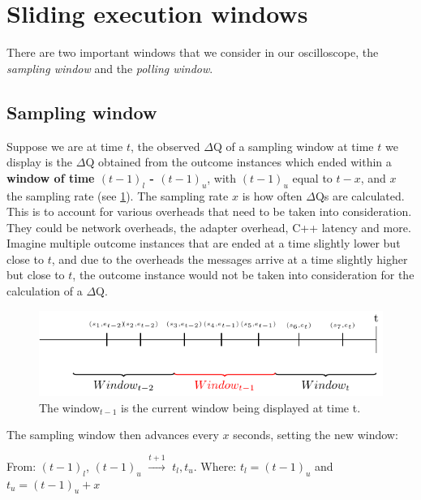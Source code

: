 \section{Sliding execution windows}

    There are two important windows that we consider in our oscilloscope, the \textit{sampling window} and the \textit{polling window}.

    \subsection{Sampling window}
    Suppose we are at time $t$, the observed $\Delta$Q of a sampling window at time $t$ we display is the $\Delta$Q obtained from the outcome instances which ended within a \textbf{window of time $(t-1)_{l}$ - $(t-1)_u$}, with $(t-1)_u$ equal to $t - x$, and $x$ the sampling rate (see \cref{fig:sampl_wi}). The sampling rate $x$ is how often $\Delta$Qs are calculated.\\
    This is to account for various overheads that need to be taken into consideration. They could be network overheads, the adapter overhead, C++ latency and more. Imagine multiple outcome instances that are ended at a time slightly lower but close to $t$, and due to the overheads the messages arrive at a time slightly higher but close to $t$, the outcome instance would not be taken into consideration for the calculation of a $\Delta$Q.
    
    \begin{figure}[H]
        \begin{center}
            \includegraphics[scale = 0.8]{tikz/window.pdf}
        \end{center}
        \caption{The window$_{t-1}$ is the current window being displayed at time t.}
        \label{fig:sampl_wi}
    \end{figure}
    
    The sampling window then advances every $x$ seconds, setting the new window: 
    \begin{center}
        From: $(t-1)_l$, $(t-1)_u$ $\xrightarrow{t + 1}$ $t_l, t_u$. Where: $t_l = (t-1)_u$ and $t_u = (t-1)_u + x$ 
    \end{center}
    
